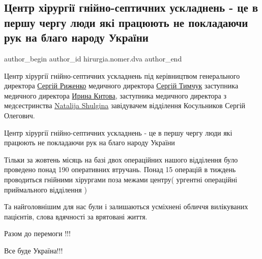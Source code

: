  
 
 
 
 

\subsection{Центр хірургії гнійно-септичних ускладнень - це в першу чергу люди які працюють не покладаючи рук на благо народу України}
\label{sec:03_11_2022.fb.hirurgia.nomer.dva.1.tsentr_kh_rurg__gn_}

\ifcmt
 author_begin
   author_id hirurgia.nomer.dva
 author_end
\fi

Центр хірургії гнійно-септичних ускладнень під керівництвом генерального
директора \href{https://www.facebook.com/rsa010963}{Сергій Риженко} медичного
директора \href{https://www.facebook.com/profile.php?id=100054781216673}{Сергій
Тимчук} заступника медичного директора
\href{https://www.facebook.com/profile.php?id=100009901380868}{Ирина Китова},
заступника медичного директора з медсестринства
\href{https://www.facebook.com/natalija.shulgina}{Natalija Shulgina}
завідувачем відділення Косульников Сергій Олегович.

Центр хірургії гнійно-септичних ускладнень - це в першу чергу люди які працюють
не покладаючи рук на благо народу України

Тільки за жовтень місяць на базі двох операційних нашого відділення було
проведено понад  190 оперативних втручань. Понад 15 операцій в тиждень
проводиться гнійними хірургами поза межами центру( ургентні операційні
приймального відділення )

Та найголовнішим  для нас  були і залишаються усміхнені обличчя вилікуваних
пацієнтів, слова вдячності за врятовані життя.

Разом до перемоги !!!

Все буде Україна!!!
